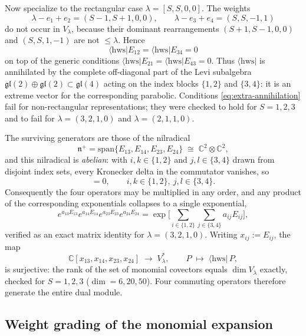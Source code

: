 \documentclass[12pt]{article}
\newcommand{\hws}{\mathrm{hws}}
\newcommand{\gl}{\mathfrak{gl}}
\begin{document}
Now specialize to the rectangular case $\lambda=[S,S,0,0]$. The weights
\[
\lambda-e_1+e_2=(S-1,S+1,0,0),\qquad
\lambda-e_3+e_4=(S,S,-1,1)
\]
do not occur in $V_\lambda$, because their dominant rearrangements
$(S+1,S-1,0,0)$ and $(S,S,1,-1)$ are not $\leq\lambda$. Hence
\begin{equation}
\langle\hws|E_{12}=\langle\hws|E_{34}=0
\label{eq:extra-annihilation}
\end{equation}
on top of the generic conditions $\langle\hws|E_{21}=\langle\hws|E_{43}=0$. Thus
$\langle\hws|$ is annihilated by the complete off-diagonal part of the Levi
subalgebra $\gl(2)\oplus\gl(2)\subset\gl(4)$ acting on the index blocks
$\{1,2\}$ and $\{3,4\}$: it is an extreme vector for the corresponding parabolic.
Conditions \eqref{eq:extra-annihilation} fail for non-rectangular
representations; they were checked to hold for $S=1,2,3$ and to fail for
$\lambda=(3,2,1,0)$ and $\lambda=(2,1,1,0)$.

The surviving generators are those of the nilradical
\begin{equation}
\mathfrak{n}^+=\mathrm{span}\{E_{13},E_{14},E_{23},E_{24}\}\;\cong\;\mathbb{C}^2\otimes\mathbb{C}^2 ,
\end{equation}
and this nilradical is \emph{abelian}: with $i,k\in\{1,2\}$ and $j,l\in\{3,4\}$
drawn from disjoint index sets, every Kronecker delta in the commutator vanishes,
so
\begin{equation}
[E_{ij},E_{kl}]=0,\qquad i,k\in\{1,2\},\ j,l\in\{3,4\}.
\label{eq:abelian}
\end{equation}
Consequently the four operators may be multiplied in any order, and any product
of the corresponding exponentials collapses to a single exponential,
\begin{equation}
e^{a_{13}E_{13}}e^{a_{14}E_{14}}e^{a_{23}E_{23}}e^{a_{24}E_{24}}
= \exp\Big[\sum_{i\in\{1,2\}}\sum_{j\in\{3,4\}} a_{ij}E_{ij}\Big],
\label{eq:merge}
\end{equation}
verified as an exact matrix identity for $\lambda=(3,2,1,0)$. Writing
$x_{ij}:=E_{ij}$, the map
\begin{equation}
\mathbb{C}[x_{13},x_{14},x_{23},x_{24}]\;\longrightarrow\;V_\lambda^*,\qquad
P\;\longmapsto\;\langle\hws|\,P ,
\label{eq:poly-map}
\end{equation}
is surjective: the rank of the set of monomial covectors equals $\dim V_\lambda$
exactly, checked for $S=1,2,3$ ($\dim=6,20,50$). Four commuting operators
therefore generate the entire dual module.

\subsection{Weight grading of the monomial expansion}
\end{document}
